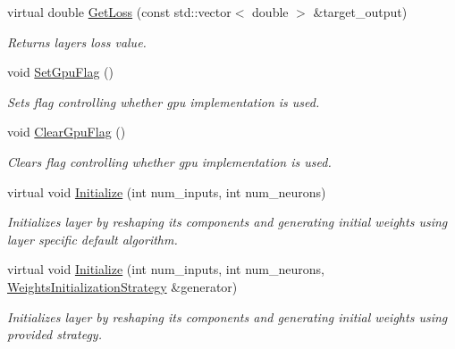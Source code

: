 \begin{DoxyCompactItemize}
\mbox{\label{classneuralnet_1_1Layer_a2da35925d900e217848443a07791b575}} 
virtual double \hyperlink{classneuralnet_1_1Layer_a2da35925d900e217848443a07791b575}{Get\+Loss} (const std\+::vector$<$ double $>$ \&target\+\_\+output)
\begin{DoxyCompactList}\small\item\em Return\textquotesingle{}s layer\textquotesingle{}s loss value. \end{DoxyCompactList}\item 
\mbox{\label{classneuralnet_1_1Layer_a42aa0b61e8b5fae656af85a7b9d9a518}} 
void \hyperlink{classneuralnet_1_1Layer_a42aa0b61e8b5fae656af85a7b9d9a518}{Set\+Gpu\+Flag} ()
\begin{DoxyCompactList}\small\item\em Sets flag controlling whether gpu implementation is used. \end{DoxyCompactList}\item 
\mbox{\label{classneuralnet_1_1Layer_a4bfdef32fbedca487e3a6b432fc40b27}} 
void \hyperlink{classneuralnet_1_1Layer_a4bfdef32fbedca487e3a6b432fc40b27}{Clear\+Gpu\+Flag} ()
\begin{DoxyCompactList}\small\item\em Clears flag controlling whether gpu implementation is used. \end{DoxyCompactList}\item 
virtual void \hyperlink{classneuralnet_1_1Layer_a722c2673491edfb9c30c0f7b2fcca29a}{Initialize} (int num\+\_\+inputs, int num\+\_\+neurons)
\begin{DoxyCompactList}\small\item\em Initializes layer by reshaping its components and generating initial weights using layer specific default algorithm. \end{DoxyCompactList}\item 
virtual void \hyperlink{classneuralnet_1_1Layer_a10b9155017dca618ca37ce3aa4546831}{Initialize} (int num\+\_\+inputs, int num\+\_\+neurons, \hyperlink{classneuralnet_1_1WeightsInitializationStrategy}{Weights\+Initialization\+Strategy} \&generator)
\begin{DoxyCompactList}\small\item\em Initializes layer by reshaping its components and generating initial weights using provided strategy. \end{DoxyCompactList}\item 

\end{DoxyCompactItemize}
